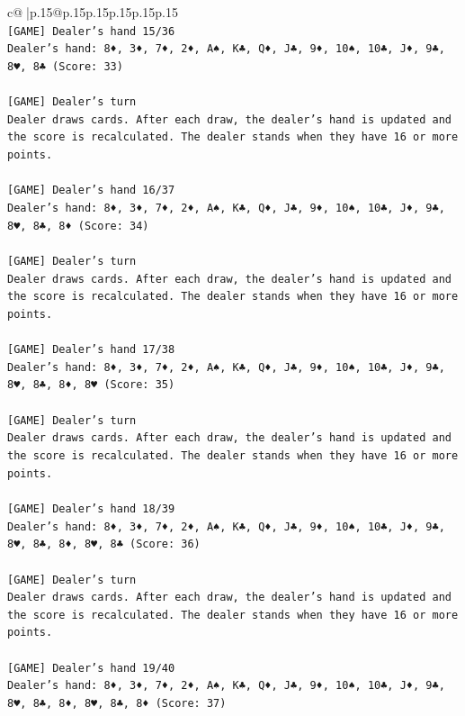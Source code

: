 \documentclass{article}
\begin{document}
{\begin{supertabular}{c@{$\;$}|p{.15\linewidth}@{}p{.15\linewidth}p{.15\linewidth}p{.15\linewidth}p{.15\linewidth}p{.15\linewidth}}
{{{\\ 
\texttt{{[}GAME{]} Dealer's hand 15/36} \\
\texttt{Dealer's hand: 8♦, 3♦, 7♦, 2♦, A♠, K♣, Q♦, J♣, 9♦, 10♠, 10♣, J♦, 9♣, 8♥, 8♣ (Score: 33)} \\
\\ 
\texttt{{[}GAME{]} Dealer's turn} \\
\texttt{Dealer draws cards. After each draw, the dealer's hand is updated and the score is recalculated. The dealer stands when they have 16 or more points.} \\
\\ 
\texttt{{[}GAME{]} Dealer's hand 16/37} \\
\texttt{Dealer's hand: 8♦, 3♦, 7♦, 2♦, A♠, K♣, Q♦, J♣, 9♦, 10♠, 10♣, J♦, 9♣, 8♥, 8♣, 8♦ (Score: 34)} \\
\\ 
\texttt{{[}GAME{]} Dealer's turn} \\
\texttt{Dealer draws cards. After each draw, the dealer's hand is updated and the score is recalculated. The dealer stands when they have 16 or more points.} \\
\\ 
\texttt{{[}GAME{]} Dealer's hand 17/38} \\
\texttt{Dealer's hand: 8♦, 3♦, 7♦, 2♦, A♠, K♣, Q♦, J♣, 9♦, 10♠, 10♣, J♦, 9♣, 8♥, 8♣, 8♦, 8♥ (Score: 35)} \\
\\ 
\texttt{{[}GAME{]} Dealer's turn} \\
\texttt{Dealer draws cards. After each draw, the dealer's hand is updated and the score is recalculated. The dealer stands when they have 16 or more points.} \\
\\ 
\texttt{{[}GAME{]} Dealer's hand 18/39} \\
\texttt{Dealer's hand: 8♦, 3♦, 7♦, 2♦, A♠, K♣, Q♦, J♣, 9♦, 10♠, 10♣, J♦, 9♣, 8♥, 8♣, 8♦, 8♥, 8♣ (Score: 36)} \\
\\ 
\texttt{{[}GAME{]} Dealer's turn} \\
\texttt{Dealer draws cards. After each draw, the dealer's hand is updated and the score is recalculated. The dealer stands when they have 16 or more points.} \\
\\ 
\texttt{{[}GAME{]} Dealer's hand 19/40} \\
\texttt{Dealer's hand: 8♦, 3♦, 7♦, 2♦, A♠, K♣, Q♦, J♣, 9♦, 10♠, 10♣, J♦, 9♣, 8♥, 8♣, 8♦, 8♥, 8♣, 8♦ (Score: 37)} \\
}}}
\end{supertabular}}
\end{document}

